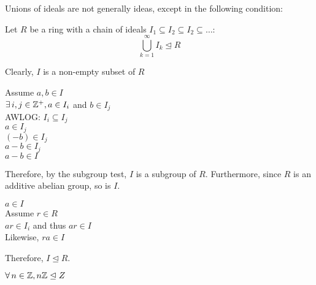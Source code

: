 \documentclass[letterpaper,12pt,fleqn]{article}
\newcommand{\ide}{\trianglelefteq}
\begin{document}
Unions of ideals are not generally ideas, except in the following condition:
\newpage
\begin{theorem}
  Let $R$ be a ring with a chain of ideals
  $I_1\subseteq I_2\subseteq I_2\subseteq\ldots$:
  \[\bigcup_{k=1}^{\infty}I_k\ide R\]
\end{theorem}

\begin{theproof}
  Clearly, $I$ is a non-empty subset of $R$

  Assume $a,b\in I$ \\
  $\exists\,i,j\in\mathbb{Z}^+,a\in I_i$ and $b\in I_j$ \\
  AWLOG: $I_i\subseteq I_j$ \\
  $a\in I_j$ \\
  $(-b)\in I_j$ \\
  $a-b\in I_j$ \\
  $a-b\in I$

  Therefore, by the subgroup test, $I$ is a subgroup of $R$. Furthermore, since
  $R$ is an additive abelian group, so is $I$.

  $a\in I$ \\
  Assume $r\in R$ \\
  $ar\in I_i$ and thus $ar\in I$ \\
  Likewise, $ra\in I$

  Therefore, $I\ide R$.
\end{theproof}

\begin{theorem}
  $\forall\,n\in\Z,n\Z\ide Z$
\end{theorem}
\end{document}
